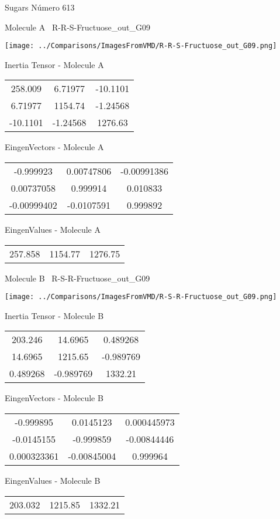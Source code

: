 \vtab[-3cm]
\begin{center}
{\large Sugars \tab Número 613}
\end{center}
\begin{multicols}{2}
\begin{center}

Molecule A \
R-R-S-Fructuose\_out\_G09

\texttt{[image: ../Comparisons/ImagesFromVMD/R-R-S-Fructuose\_out\_G09.png]}

Inertia Tensor - Molecule A \\
\begin{tabular}{|c c c|}
258.009	 & 	6.71977	 & 	-10.1101	 \\
6.71977	 & 	1154.74	 & 	-1.24568	 \\
-10.1101	 & 	-1.24568	 & 	1276.63
\end{tabular}

\vtab
 EingenVectors - Molecule A     \\
\begin{tabular}{|c c c|}
-0.999923	 & 	0.00747806	 & 	-0.00991386	 \\
0.00737058	 & 	0.999914	 & 	0.010833	 \\
-0.00999402	 & 	-0.0107591	 & 	0.999892
\end{tabular}

\vtab
 EingenValues - Molecule A     \\
\begin{tabular}{|c c c|}
257.858	 & 	1154.77	 & 	1276.75	 \\
\end{tabular}
\columnbreak

Molecule B \
R-S-R-Fructuose\_out\_G09

\texttt{[image: ../Comparisons/ImagesFromVMD/R-S-R-Fructuose\_out\_G09.png]}

Inertia Tensor - Molecule B \\
\begin{tabular}{|c c c|}
203.246	 & 	14.6965	 & 	0.489268	 \\
14.6965	 & 	1215.65	 & 	-0.989769	 \\
0.489268	 & 	-0.989769	 & 	1332.21
\end{tabular}

\vtab
 EingenVectors - Molecule B     \\
\begin{tabular}{|c c c|}
-0.999895	 & 	0.0145123	 & 	0.000445973	 \\
-0.0145155	 & 	-0.999859	 & 	-0.00844446	 \\
0.000323361	 & 	-0.00845004	 & 	0.999964
\end{tabular}

\vtab
 EingenValues - Molecule B     \\
\begin{tabular}{|c c c|}
203.032	 & 	1215.85	 & 	1332.21	 \\
\end{tabular}

\end{center}
\end{multicols}

